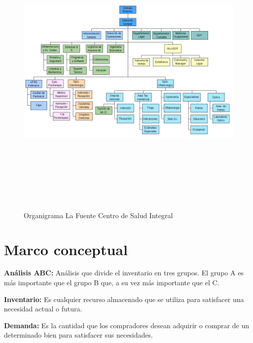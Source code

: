 \begin{landscape} %
\begin{figure}[h!]
  \caption{Organigrama La Fuente Centro de Salud Integral}
  {\includegraphics[width=25cm, height=14cm]{images/organigrama.png}}
  \label{fig:organigrama_fuente}
\end{figure} 
\end{landscape} %

\section{Marco conceptual}
\noindent
\textbf{Análisis ABC:} Análisis que divide el inventario en tres grupos. El grupo A es más importante que el grupo B que, a su vez más importante que el C. \citep{render2006metodos}\vspace{0.25cm}

\noindent
\textbf{Inventario:} Es cualquier recurso almacenado que se utiliza para satisfacer una necesidad actual o futura. \citep{render2006metodos}\vspace{0.25cm}

\noindent
\textbf{Demanda:} Es la cantidad que los compradores desean adquirir o comprar de un determinado bien para satisfacer sus necesidades. \citep{mankiw2007principios}\vspace{0.25cm}


